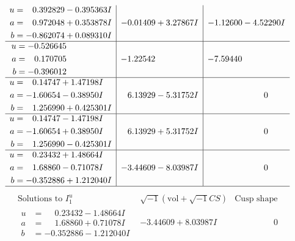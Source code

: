 \documentclass[1p]{elsarticle_modified}
\theoremstyle{definition}
\newcommand{\I}{\sqrt{-1}}
\begin{document}
$$\begin{array}{c|c|c}
\begin{aligned}
u &= \phantom{-}0.392829 - 0.395363 I \\
a &= \phantom{-}0.972048 + 0.353878 I \\
b &= -0.862074 + 0.089310 I\end{aligned}
 & -0.01409 + 3.27867 I & -1.12600 - 4.52290 I \\ \hline\begin{aligned}
u &= -0.526645\phantom{ +0.000000I} \\
a &= \phantom{-}0.170705\phantom{ +0.000000I} \\
b &= -0.396012\phantom{ +0.000000I}\end{aligned}
 & -1.22542\phantom{ +0.000000I} & -7.59440\phantom{ +0.000000I} \\ \hline\begin{aligned}
u &= \phantom{-}0.14747 + 1.47198 I \\
a &= -1.60654 - 0.38950 I \\
b &= \phantom{-}1.256990 + 0.425301 I\end{aligned}
 & \phantom{-}6.13929 - 5.31752 I & \phantom{-0.000000 } 0 \\ \hline\begin{aligned}
u &= \phantom{-}0.14747 - 1.47198 I \\
a &= -1.60654 + 0.38950 I \\
b &= \phantom{-}1.256990 - 0.425301 I\end{aligned}
 & \phantom{-}6.13929 + 5.31752 I & \phantom{-0.000000 } 0 \\ \hline\begin{aligned}
u &= \phantom{-}0.23432 + 1.48664 I \\
a &= \phantom{-}1.68860 - 0.71078 I \\
b &= -0.352886 + 1.212040 I\end{aligned}
 & -3.44609 - 8.03987 I & \phantom{-0.000000 } 0\\
 \hline 
 \end{array}$$\newpage$$\begin{array}{c|c|c}  
\text{Solutions to }I^u_{1}& \I (\text{vol} + \sqrt{-1}CS) & \text{Cusp shape}\\
 \hline 
\begin{aligned}
u &= \phantom{-}0.23432 - 1.48664 I \\
a &= \phantom{-}1.68860 + 0.71078 I \\
b &= -0.352886 - 1.212040 I\end{aligned}
 & -3.44609 + 8.03987 I & \phantom{-0.000000 } 0 \\ \hline\begin{aligned}

\end{aligned}
\end{array}$$
\end{document}
